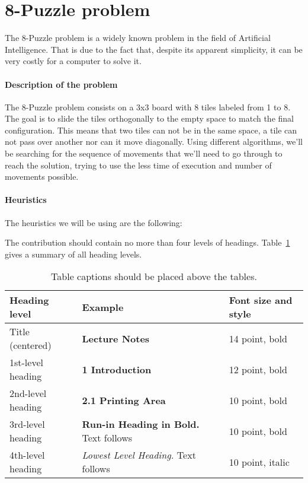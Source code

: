 \documentclass[runningheads]{llncs}
\begin{document}
\section{8-Puzzle problem}
The 8-Puzzle problem is a widely known problem in the field of Artificial Intelligence. That is due to the fact that, despite its apparent simplicity, it can be very costly for a computer to solve it.
\paragraph{Description of the problem}
The 8-Puzzle problem consists on a 3x3 board with 8 tiles labeled from 1 to 8. The goal is to slide the tiles orthogonally to the empty space to match the final configuration. This means that two tiles can not be in the same space, a tile can not pass over another nor can it move diagonally.
Using different algorithms, we'll be searching for the sequence of movements that we'll need to go through to reach the solution, trying to use the less time of execution and number of movements possible.

\paragraph{Heuristics}
The heuristics we will be using are the following:

The contribution should contain no more than four levels of
headings. Table~\ref{tab1} gives a summary of all heading levels.

\begin{table}
\caption{Table captions should be placed above the
tables.}\label{tab1}
\begin{tabular}{|l|l|l|}
\hline
Heading level &  Example & Font size and style\\
\hline
Title (centered) &  {\Large\bfseries Lecture Notes} & 14 point, bold\\
1st-level heading &  {\large\bfseries 1 Introduction} & 12 point, bold\\
2nd-level heading & {\bfseries 2.1 Printing Area} & 10 point, bold\\
3rd-level heading & {\bfseries Run-in Heading in Bold.} Text follows & 10 point, bold\\
4th-level heading & {\itshape Lowest Level Heading.} Text follows & 10 point, italic\\
\hline
\end{tabular}
\end{table}
\end{document}
